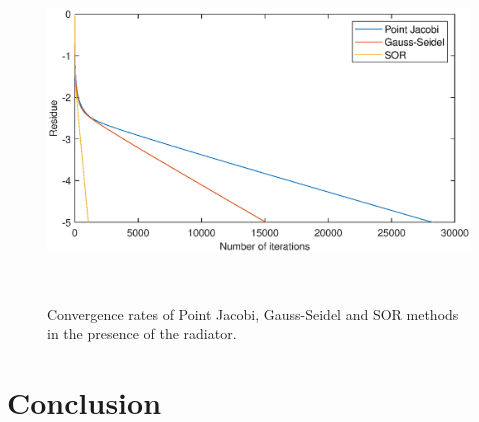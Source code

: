 \documentclass[letterpaper,12pt]{article}
\begin{document}
\begin{figure}[H] 
	\centering 
	\includegraphics[max height=9cm]{graphs/residual_SOR19_defaultrad.eps}
	\caption{Convergence rates of Point Jacobi, Gauss-Seidel and SOR methods in the presence of the radiator.}
 	\label{fig:convrad}
\end{figure}

\section{Conclusion}
\end{document}
